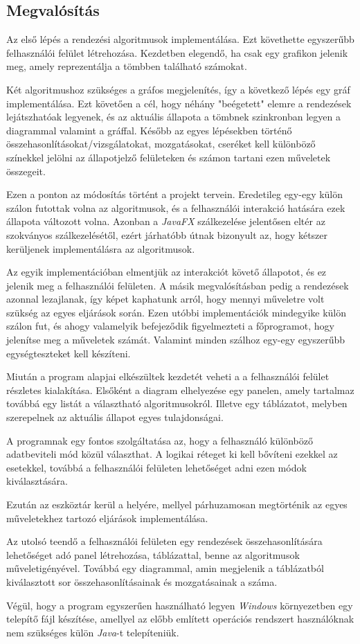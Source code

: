 \documentclass{elteikthesis}
\begin{document}
\subsection{Megvalósítás}
Az első lépés a rendezési algoritmusok implementálása.
Ezt követhette egyszerűbb felhasználói felület létrehozása. Kezdetben elegendő, ha csak egy grafikon jelenik meg, amely reprezentálja a tömbben található számokat.\par
Két algoritmushoz szükséges a gráfos megjelenítés, így a következő lépés egy gráf implementálása.
Ezt követően a cél, hogy néhány "beégetett" elemre a rendezések lejátszhatóak legyenek, és az aktuális állapota a tömbnek szinkronban legyen a diagrammal valamint a gráffal. Később az egyes lépésekben történő összehasonlításokat/vizsgálatokat, mozgatásokat, cseréket kell különböző színekkel jelölni az állapotjelző felületeken és számon tartani ezen műveletek összegeit.\par
Ezen a ponton az módosítás történt a projekt tervein. Eredetileg egy-egy külön szálon futottak volna az algoritmusok, és a felhasználói interakció hatására ezek állapota változott volna. Azonban a \emph{JavaFX} szálkezelése jelentősen eltér az szokványos szálkezelésétől, ezért járhatóbb útnak bizonyult az, hogy kétszer kerüljenek implementálásra az algoritmusok.\par Az egyik implementációban elmentjük az interakciót követő állapotot, és ez jelenik meg a felhasználói felületen. A másik megvalósításban pedig a rendezések azonnal lezajlanak, így képet kaphatunk arról, hogy mennyi műveletre volt szükség az egyes eljárások során. Ezen utóbbi implementációk mindegyike külön szálon fut, és ahogy valamelyik befejeződik figyelmezteti a főprogramot, hogy jelenítse meg a műveletek számát. Valamint minden szálhoz egy-egy egyszerűbb egységteszteket kell készíteni.\par
Miután a program alapjai elkészültek kezdetét veheti a a felhasználói felület részletes kialakítása. Elsőként a diagram elhelyezése egy panelen, amely tartalmaz továbbá egy listát a választható algoritmusokról. Illetve egy táblázatot, melyben szerepelnek az aktuális állapot egyes tulajdonságai.\par
A programnak egy fontos szolgáltatása az, hogy a felhasználó különböző adatbeviteli mód közül választhat. A logikai réteget ki kell bővíteni ezekkel az esetekkel, továbbá a felhasználói felületen lehetőséget adni ezen módok kiválasztására.\par
Ezután az eszköztár kerül a helyére, mellyel párhuzamosan megtörténik az egyes műveletekhez tartozó eljárások implementálása.\par
Az utolsó teendő a felhasználói felületen egy rendezések összehasonlítására lehetőséget adó panel létrehozása, táblázattal, benne az algoritmusok műveletigényével. Továbbá egy diagrammal, amin megjelenik a táblázatból kiválasztott sor összehasonlításainak és mozgatásainak a száma.\par
Végül, hogy a program egyszerűen használható legyen \emph{Windows} környezetben egy telepítő fájl készítése, amellyel az előbb említett operációs rendszert használóknak nem szükséges külön \emph{Java}-t telepíteniük.
\end{document}
